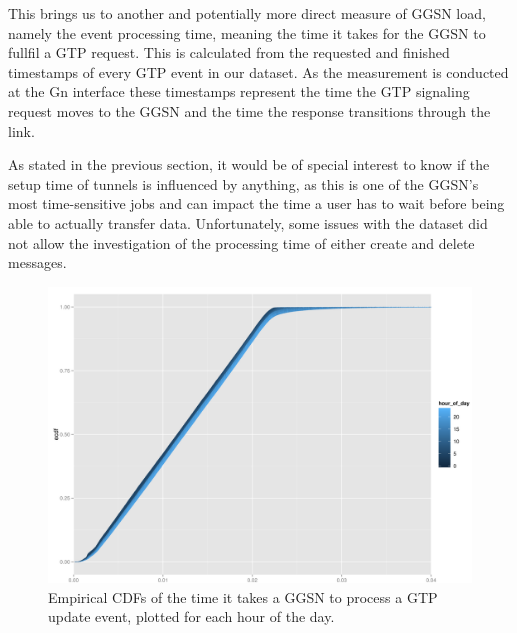 This brings us to another and potentially more direct measure of \ac{GGSN} load, namely the event processing time, meaning the time it takes for the \ac{GGSN} to fullfil a \ac{GTP} request. This is calculated from the requested and finished timestamps of every \ac{GTP} event in our dataset. As the measurement is conducted at the Gn interface these timestamps represent the time the \ac{GTP} signaling request moves to the \ac{GGSN} and the time the response transitions through the link.

As stated in the previous section, it would be of special interest to know if the setup time of tunnels is influenced by anything, as this is one of the \ac{GGSN}'s most time-sensitive jobs and can impact the time a user has to wait before being able to actually transfer data. Unfortunately, some issues with the dataset did not allow the investigation of the processing time of either create and delete messages.

\begin{figure}
	\centering
	\includegraphics[width=\columnwidth]{images/IMC2013/R-update-time-cdfs.png}
	\caption{Empirical CDFs of the time it takes a GGSN to process a GTP update event, plotted for each hour of the day.}
	\label{fig:update-time}
\end{figure}


